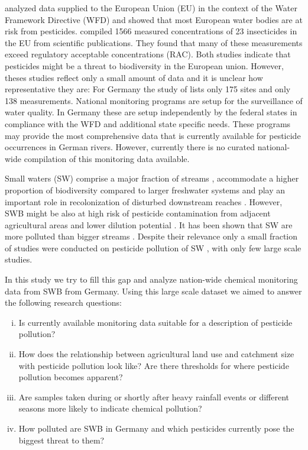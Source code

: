 \documentclass[journal=esthag,manuscript=article]{achemso}
\begin{document}
\citet{malaj_organic_2014} analyzed data supplied to the European Union (EU) in the context of the Water Framework Directive (WFD) and showed that most European water bodies are at risk from pesticides.
\citet{stehle_pesticide_2015} compiled 1566 measured concentrations of 23 insecticides in the EU from scientific publications. 
They found that many of these measurements exceed regulatory acceptable concentrations (RAC).
Both studies indicate that pesticides might be a threat to biodiversity in the European union. 
However, theses studies reflect only a small amount of data and it is unclear how representative they are:
For Germany the study of \citet{malaj_organic_2014} lists only 175 sites and \citet{stehle_pesticide_2015} only 138 measurements. %
National monitoring programs are setup for the surveillance of water quality.
In Germany these are setup independently by the federal states in compliance with the WFD \citep{quevauviller_water_2008} and additional state specific needs. 
These programs may provide the most comprehensive data that is currently available for pesticide occurrences in German rivers.
However, currently there is no curated national-wide compilation of this monitoring data available.

Small waters (SW) comprise a major fraction of streams \citep{nadeau_hydrological_2007}, accommodate a higher proportion of biodiversity compared to larger freshwater systems \citep{davies_comparison_2008, biggs_report_2014} and play an important role in recolonization of disturbed downstream reaches \citep{liess_analyzing_2005, orlinskiy_forested_2015}.
However, SWB might be also at high risk of pesticide contamination from adjacent agricultural areas and lower dilution potential \citep{schulz_field_2004}.
It has been shown that SW are more polluted than bigger streams \citep{stehle_pesticide_2015,schulz_field_2004}.
Despite their relevance only a small fraction of studies were conducted on pesticide pollution of SW , with only few large scale studies.

In this study we try to fill this gap and analyze nation-wide chemical monitoring data from SWB from Germany.
Using this large scale dataset we aimed to answer the following research questions: 

\begin{enumerate}[(i)]
  \item Is currently available monitoring data suitable for a description of pesticide pollution?
	\item How does the relationship between agricultural land use and catchment size with pesticide pollution look like?
  Are there thresholds for where pesticide pollution becomes apparent?
  \item Are samples taken during or shortly after heavy rainfall events or different seasons more likely to indicate chemical pollution?
	\item  How polluted are SWB in Germany and which pesticides currently pose the biggest threat to them?
\end{enumerate}
\end{document}
